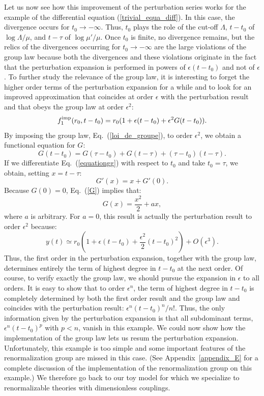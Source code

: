 \documentclass[floatfix,preprintnumbers,amsmath,amssymb,prb,12pt]{revtex4-1}
\begin{document}
Let us now see how this improvement of the perturbation series works for the example of
the differential equation (\ref{trivial_equa_diff}). In this case, the divergence occurs for
$t_0\to-\infty$. Thus, $t_0$ plays the role of the cut-off
$\Lambda$, $t-t_0$ of $\log\Lambda/\mu$, and 
$t-\tau$ of $\log\mu'/\mu$. Once $t_0$ is finite, no divergence
remains, but the relics of the divergences occurring for
$t_0\to-\infty$ are the large violations of the group law because
both the divergences and these violations originate in the fact
that the perturbation expansion is performed in powers of
$\epsilon(t-t_0)$ and not of $\epsilon$. To further study the
relevance of the group law, it is interesting to forget the higher
order terms of the perturbation expansion for a while and to look
for an improved approximation that coincides at order
$\epsilon$ with the perturbation result and that obeys the
group law at order
$\epsilon^2$:
\begin{equation}
f_1^{\rm imp}(r_0,t-t_0)=r_0(1+\epsilon(t-t_0)+\epsilon^2
G(t-t_0)).
\label{fimp}
\end{equation}
By imposing the group law, Eq.~(\ref{loi_de_groupe}), to order
$\epsilon^2$, we obtain a functional equation for $G$:
\begin{equation}
G(t-t_0)=G(\tau-t_0)+ G(t-\tau) + (\tau-t_0)(t-\tau).
\label{equationgg}
\end{equation}
If we differentiate Eq.~(\ref{equationgg}) with respect to $t_0$
and take $t_0=\tau$, we obtain, setting $x=t-\tau$:
\begin{equation}
G'(x)=x+G'(0).
\label{G}
\end{equation}
Because $G(0)=0$, Eq.~(\ref{G}) implies that:
\begin{equation}
G(x)=\frac{x^2}{2}+ a x,
\label{solution_fimp}
\end{equation}
where $a$ is arbitrary. For $a=0$, this result is
actually the perturbation result to order $\epsilon^2$ because:
\begin{equation}
y(t)\simeq r_0 (1+\epsilon(t-t_0) + \frac{\epsilon^2}{2}
(t-t_0)^2) + O(\epsilon^3).
\end{equation}
Thus, the first order in the perturbation expansion, together with
the group law, determines entirely the term of highest degree in
$t-t_0$ at the next order. Of course, to verify exactly the
group law, we should pursue the expansion in $\epsilon$ to all
orders. It is easy to show that to order
$\epsilon^n$, the term of highest degree in $t-t_0$ is completely
determined by both the first order result and the group law and
coincides with the perturbation result: $\epsilon^n(t-t_0)^n/n!$.
Thus, the only information given by the perturbation expansion is
that all subdominant terms, $\epsilon^n(t-t_0)^p$ with $p<n$, 
vanish in this example. We could now show how the
implementation of the group law lets us resum the perturbation
expansion. Unfortunately, this example is too simple and some
important features of the renormalization group are missed in this
case. (See Appendix~\ref{appendix_E} for a complete discussion of
the implementation of the renormalization group on this example.)
We therefore go back to our toy model for which we specialize to
renormalizable theories with dimensionless couplings. 
\end{document}
